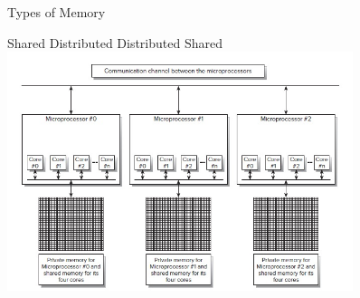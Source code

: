\documentclass[xcolor=x11names,compress]{beamer}
\renewcommand{\(}{\begin{columns}}
\renewcommand{\)}{\end{columns}}
\newcommand{\<}[1]{\begin{column}{#1}}
\renewcommand{\>}{\end{column}}
\begin{document}
\begin{frame}{Types of Memory}

\begin{center}
Shared \hspace*{2 em} Distributed \hspace*{2 em} Distributed Shared
\includegraphics[height=2.75in,clip]{../figs/MemorySystems}
\end{center}

\end{frame}
\end{document}
